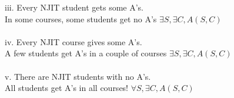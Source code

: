 \documentclass[10pt]{article}
\begin{document}
iii.  Every NJIT student gets some A's.\\
In some courses, some students get no A's 
$\exists S, \exists C, A(S,C)$\\~\\

iv. Every NJIT course gives some A's.\\
A few students get A's in a couple of courses
$\exists S, \exists C, A(S,C)$\\~\\
 
v.  There are NJIT students with no A's.\\
All students get A's in all courses!
$\forall S, \exists C, A(S,C)$\\~\\
\end{document}
